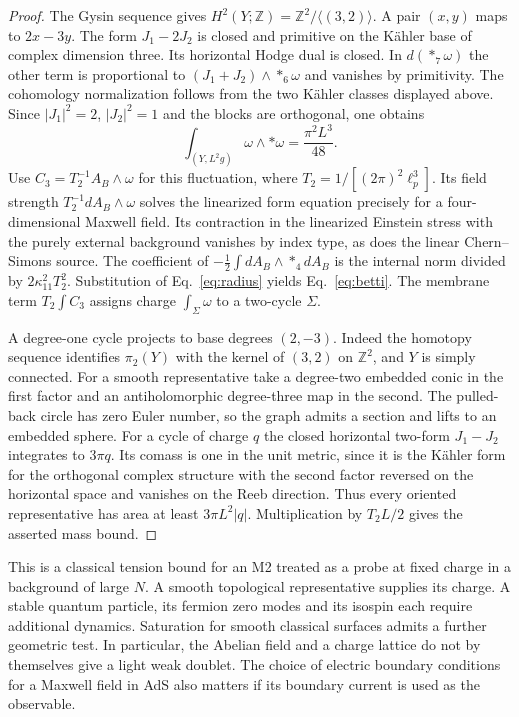\documentclass[aps,prd,reprint,onecolumn,nofootinbib,amsmath,amssymb]{revtex4-2}
\begin{document}
\begin{proof}
The Gysin sequence gives $H^2(Y;\mathbb Z)=\mathbb Z^2/\langle(3,2)\rangle$. A pair $(x,y)$ maps to $2x-3y$. The form $J_1-2J_2$ is closed and primitive on the Kähler base of complex dimension three. Its horizontal Hodge dual is closed. In $d(*_7\omega)$ the other term is proportional to $(J_1+J_2)\wedge *_6\omega$ and vanishes by primitivity. The cohomology normalization follows from the two Kähler classes displayed above. Since $|J_1|^2=2$, $|J_2|^2=1$ and the blocks are orthogonal, one obtains
\begin{equation}
 \int_{(Y,L^2\hat g)}\omega\wedge*\omega=\frac{\pi^2 L^3}{48}.
\end{equation}
Use $C_3=T_2^{-1} A_B\wedge\omega$ for this fluctuation, where $T_2=1/[(2\pi)^2\ell_p^3]$. Its field strength $T_2^{-1}dA_B\wedge\omega$ solves the linearized form equation precisely for a four-dimensional Maxwell field. Its contraction in the linearized Einstein stress with the purely external background vanishes by index type, as does the linear Chern--Simons source. The coefficient of $-\tfrac12\int dA_B\wedge *_4dA_B$ is the internal norm divided by $2\kappa_{11}^2T_2^2$. Substitution of Eq.~\eqref{eq:radius} yields Eq.~\eqref{eq:betti}. The membrane term $T_2\int C_3$ assigns charge $\int_\Sigma\omega$ to a two-cycle $\Sigma$.

A degree-one cycle projects to base degrees $(2,-3)$. Indeed the homotopy sequence identifies $\pi_2(Y)$ with the kernel of $(3,2)$ on $\mathbb Z^2$, and $Y$ is simply connected. For a smooth representative take a degree-two embedded conic in the first factor and an antiholomorphic degree-three map in the second. The pulled-back circle has zero Euler number, so the graph admits a section and lifts to an embedded sphere. For a cycle of charge $q$ the closed horizontal two-form $J_1-J_2$ integrates to $3\pi q$. Its comass is one in the unit metric, since it is the Kähler form for the orthogonal complex structure with the second factor reversed on the horizontal space and vanishes on the Reeb direction. Thus every oriented representative has area at least $3\pi L^2|q|$. Multiplication by $T_2 L/2$ gives the asserted mass bound.
\end{proof}

This is a classical tension bound for an M2 treated as a probe at fixed charge in a background of large $N$. A smooth topological representative supplies its charge. A stable quantum particle, its fermion zero modes and its isospin each require additional dynamics. Saturation for smooth classical surfaces admits a further geometric test. In particular, the Abelian field and a charge lattice do not by themselves give a light weak doublet. The choice of electric boundary conditions for a Maxwell field in AdS also matters if its boundary current is used as the observable.
\end{document}
